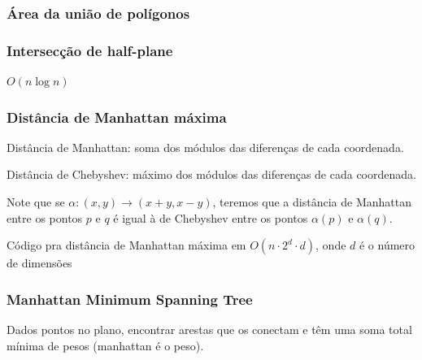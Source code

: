 
\subsubsection{Área da união de polígonos}


\subsubsection{Intersecção de half-plane}

$O(n \log n)$


\subsubsection{Distância de Manhattan máxima}

Distância de Manhattan: soma dos módulos das diferenças de cada coordenada.

Distância de Chebyshev: máximo dos módulos das diferenças de cada coordenada.

Note que se $\alpha : (x, y) \to (x+y, x-y)$, teremos que a distância de
Manhattan entre os pontos $p$ e $q$ é igual à de Chebyshev entre os pontos
$\alpha(p)$ e $\alpha(q)$.

Código pra distância de Manhattan máxima em $O(n \cdot 2^d \cdot d)$, onde $d$ 
é o número de dimensões


\subsubsection{Manhattan Minimum Spanning Tree}

Dados pontos no plano, encontrar arestas que os conectam e têm uma soma total
mínima de pesos (manhattan é o peso).

